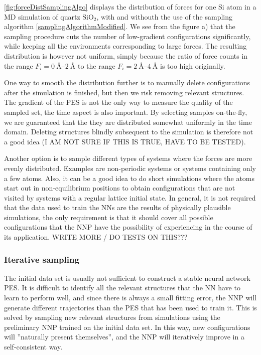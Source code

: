 \documentclass[twoside,english]{uiofysmaster}
\begin{document}
\autoref{fig:forceDistSamplingAlgo} displays the distribution of forces for one Si atom in a MD simulation
of quartz $\textrm{SiO}_2$, with and withouth the use of the sampling algorithm \eqref{samplingAlgorithmModified}. 
We see from the figure a) that the sampling procedure cuts the number of low-gradient configurations significantly, 
while keeping all the environments corresponding to large forces. The resulting distribution is however not uniform, simply
because the ratio of force counts in the range $F_i = \SIrange{0}{2}{\angstrom}$ to the range $F_i = \SIrange{2}{4}{\angstrom}$
is too high originally.

One way to smooth the distribution further is to manually delete configurations after the simulation 
is finished, but then we risk removing relevant structures. The gradient of the PES is not the only way 
to measure the quality of the sampled set, the time aspect is also important. 
By selecting samples on-the-fly, we are guaranteed that the they are distributed somewhat uniformly in the time domain. 
Deleting structures blindly subsequent to the simulation is therefore not a good idea (I AM NOT SURE IF THIS IS TRUE, 
HAVE TO BE TESTED).

Another option is to sample different types of systems where the forces are more evenly distributed. 
Examples are non-periodic systems or systems containing only a few atoms. Also, it can be a good idea 
to do short simulations where the atoms start out in non-equilibrium positions to obtain configurations
that are not visited by systems with a regular lattice initial state. 
In general, it is not required that the data used to train the NNs are the results of physically plausible 
simulations, the only requirement is that it should cover all possible configurations that the NNP have the possibility
of experiencing in the course of its application. WRITE MORE / DO TESTS ON THIS???

\subsubsection{Iterative sampling}
The initial data set is usually not sufficient to construct a stable neural network PES. 
It is difficult to identify all the relevant structures that the NN have to learn to perform well, and 
since there is always a small fitting error, the 
NNP will generate different trajectories than the PES that has been used to train it. This is solved
by sampling new relevant structures from simulations using the preliminary NNP trained on the initial data set. 
In this way, new configurations
will ''naturally present themselves'', and the NNP will iteratively improve in a self-consistent way.
\end{document}
